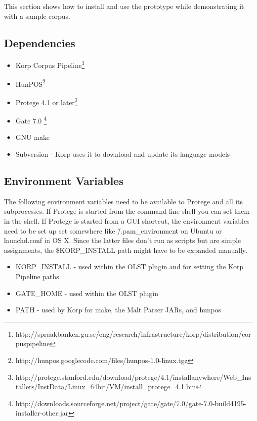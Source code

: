 \documentclass[a4paper]{report}
\begin{document}
This section shows how to install and use the prototype while demonstrating it with a sample corpus.

\subsection{Dependencies}
\label{subsec:results:deps}

\begin{itemize}
\item Korp Corpus Pipeline\footnote{http://spraakbanken.gu.se/eng/research/infrastructure/korp/distribution/corpuspipeline}
\item HunPOS\footnote{http://hunpos.googlecode.com/files/hunpos-1.0-linux.tgz}
\item Protege 4.1 or later\footnote{http://protege.stanford.edu/download/protege/4.1/installanywhere/Web\_Installers/InstData/Linux\_64bit/VM/install\_protege\_4.1.bin}
\item Gate 7.0 \footnote{http://downloads.sourceforge.net/project/gate/gate/7.0/gate-7.0-build4195-installer-other.jar}
\item GNU make
\item Subversion - Korp uses it to download and update its language models
\end{itemize}

\subsection{Environment Variables}

The following environment variables need to be available to Protege and all its subprocesses.
If Protege is started from the command line shell you can set them in the shell.
If Protege is started from a GUI shortcut, the environment variables need to be set up set somewhere like \~/.pam\_environment on Ubuntu or launchd.conf in OS X.
Since the latter files don't run as scripts but are simple assignments, the \$KORP\_INSTALL path might have to be expanded manually.

\begin{itemize}
\item KORP\_INSTALL - used within the OLST plugin and for setting the Korp Pipeline paths
\item GATE\_HOME - used within the OLST plugin
\item PATH - used by Korp for make, the Malt Parser JARs, and hunpos      
\end{itemize}
\end{document}

